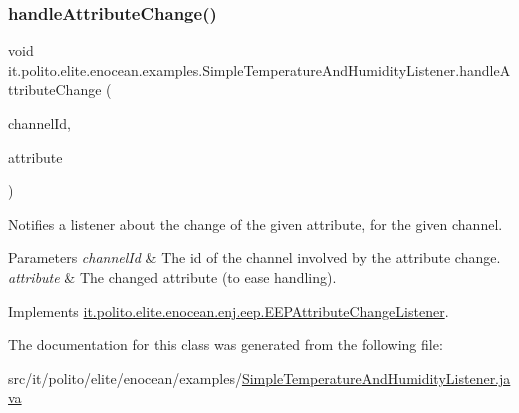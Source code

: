 \subsubsection{\texorpdfstring{handle\+Attribute\+Change()}{handleAttributeChange()}}
{\footnotesize\ttfamily void it.\+polito.\+elite.\+enocean.\+examples.\+Simple\+Temperature\+And\+Humidity\+Listener.\+handle\+Attribute\+Change (\begin{DoxyParamCaption}\item[{int}]{channel\+Id,  }\item[{\hyperlink{classit_1_1polito_1_1elite_1_1enocean_1_1enj_1_1eep_1_1_e_e_p_attribute}{E\+E\+P\+Attribute}$<$?$>$}]{attribute }\end{DoxyParamCaption})}

Notifies a listener about the change of the given attribute, for the given channel. 
\begin{DoxyParams}{Parameters}
{\em channel\+Id} & The id of the channel involved by the attribute change. \\
\hline
{\em attribute} & The changed attribute (to ease handling). \\
\hline
\end{DoxyParams}


Implements \hyperlink{interfaceit_1_1polito_1_1elite_1_1enocean_1_1enj_1_1eep_1_1_e_e_p_attribute_change_listener_a8ed543f4de048252dfd133116d488382}{it.\+polito.\+elite.\+enocean.\+enj.\+eep.\+E\+E\+P\+Attribute\+Change\+Listener}.



The documentation for this class was generated from the following file\+:\begin{DoxyCompactItemize}
\item 
src/it/polito/elite/enocean/examples/\hyperlink{_simple_temperature_and_humidity_listener_8java}{Simple\+Temperature\+And\+Humidity\+Listener.\+java}\end{DoxyCompactItemize}
